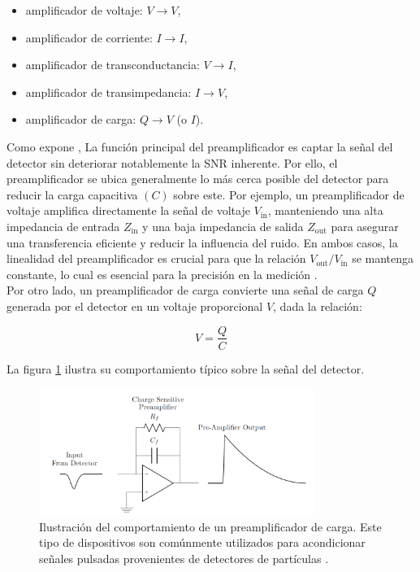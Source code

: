 \documentclass[]{book}
\begin{document}
\begin{itemize}
    \item amplificador de voltaje: $V \rightarrow V$,
    \item amplificador de corriente: $I \rightarrow I$,
    \item amplificador de transconductancia: $V \rightarrow I$,
    \item amplificador de transimpedancia: $I \rightarrow V$,
    \item amplificador de carga: $Q \rightarrow V$ (o $I$).
\end{itemize}

\noindent Como expone \cite{knoll2010radiation}, La función principal del preamplificador es captar la señal del detector sin deteriorar notablemente la SNR inherente. Por ello, el preamplificador se ubica generalmente lo más cerca posible del detector para reducir la carga capacitiva $(C)$ sobre este. Por ejemplo, un preamplificador de voltaje amplifica directamente la señal de voltaje $V_{\text{in}}$, manteniendo una alta impedancia de entrada $Z_{\text{in}}$ y una baja impedancia de salida $Z_{\text{out}}$ para asegurar una transferencia eficiente y reducir la influencia del ruido. En ambos casos, la linealidad del preamplificador es crucial para que la relación $V_{\text{out}}/ V_{\text{in}}$ se mantenga constante, lo cual es esencial para la precisión en la medición \cite{leo1994techniques}.\\

\noindent Por otro lado, un preamplificador de carga convierte una señal de carga $Q$ generada por el detector en un voltaje proporcional $V$, dada la relación: 

\begin{equation}
    V = \frac{Q}{C}
\end{equation}

La figura \ref{fig:preamp} ilustra su comportamiento típico sobre la señal del detector.\\

\begin{figure}[h]
    \centering
    \includegraphics[width=0.8\textwidth]{preamp.PNG}
    \caption{Ilustración del comportamiento de un preamplificador de carga. Este tipo de dispositivos son comúnmente utilizados para acondicionar señales pulsadas provenientes de detectores de partículas \cite{kolanoski2020particle}.}
    \label{fig:preamp}

\end{figure}
\end{document}

